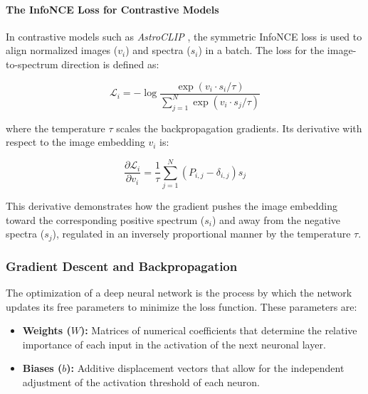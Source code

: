 \paragraph{The InfoNCE Loss for Contrastive Models}

In contrastive models such as \textit{AstroCLIP} \autocite{ar:astroclip}, the symmetric InfoNCE loss is used to align normalized images ($v_i$) and spectra ($s_i$) in a batch. The loss for the image-to-spectrum direction is defined as:

\begin{equation}
\mathcal{L}_{i} = -\log \dfrac{\exp\left(v_i \cdot s_i / \tau\right)}{\sum_{j=1}^{N} \exp\left(v_i \cdot s_j / \tau\right)}
\label{eq:infonce_loss}
\end{equation}

where the temperature $\tau$ scales the backpropagation gradients. Its derivative with respect to the image embedding $v_i$ is:

\begin{equation}
\dfrac{\partial \mathcal{L}_i}{\partial v_i} = \dfrac{1}{\tau} \sum_{j=1}^{N} \left(P_{i,j} - \delta_{i,j}\right) s_j
\label{eq:infonce_derivative}
\end{equation}

This derivative demonstrates how the gradient pushes the image embedding toward the corresponding positive spectrum ($s_i$) and away from the negative spectra ($s_j$), regulated in an inversely proportional manner by the temperature $\tau$.

\subsubsection{Gradient Descent and Backpropagation}

The optimization of a deep neural network is the process by which the network updates its free parameters to minimize the loss function. These parameters are:
\begin{itemize}
\item \textbf{Weights ($W$):} Matrices of numerical coefficients that determine the relative importance of each input in the activation of the next neuronal layer.
\item \textbf{Biases ($b$):} Additive displacement vectors that allow for the independent adjustment of the activation threshold of each neuron.
\end{itemize}

